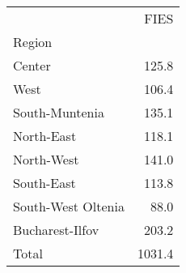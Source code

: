\begin{tabular}{lr}
\toprule
{} &    FIES \\
Region             &         \\
\midrule
Center             &   125.8 \\
West               &   106.4 \\
South-Muntenia     &   135.1 \\
North-East         &   118.1 \\
North-West         &   141.0 \\
South-East         &   113.8 \\
South-West Oltenia &    88.0 \\
Bucharest-Ilfov    &   203.2 \\
Total              &  1031.4 \\
\bottomrule
\end{tabular}
